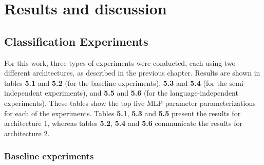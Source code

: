 
\chapter{Results and discussion}
\label{ch:omnisvoluptas}




\section{Classification Experiments}

For this work, three types of experiments were conducted, each using two different architectures, as described in the previous chapter. Results are shown in tables \textbf{5.1} and \textbf{5.2} (for the baseline experiments), \textbf{5.3} and \textbf{5.4} (for the semi-independent experiments), and \textbf{5.5} and \textbf{5.6} (for the language-independent experiments). These tables show the top five MLP parameter parameterizations for each of the experiments. Tables \textbf{5.1}, \textbf{5.3} and \textbf{5.5} present the results for architecture 1, whereas tables \textbf{5.2}, \textbf{5.4} and \textbf{5.6} communicate the results for architecture 2.

\subsection{Baseline experiments}

